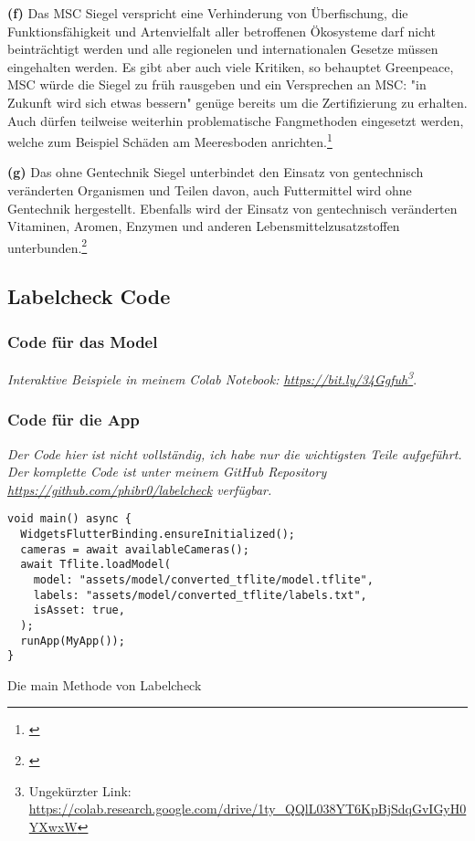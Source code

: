 \noindent\textbf{(f)} Das MSC Siegel verspricht eine Verhinderung von Überfischung, die Funktionsfähigkeit und Artenvielfalt aller betroffenen Ökosysteme darf nicht beinträchtigt werden und alle regionelen und internationalen Gesetze müssen eingehalten werden. Es gibt aber auch viele Kritiken, so behauptet Greenpeace, MSC würde die Siegel zu früh rausgeben und ein Versprechen an MSC: "in Zukunft wird sich etwas bessern" genüge bereits um die Zertifizierung zu erhalten. Auch dürfen teilweise weiterhin problematische Fangmethoden eingesetzt werden, welche zum Beispiel Schäden am Meeresboden anrichten.\footnote{\cite{msc}}

\noindent\textbf{(g)} Das ohne Gentechnik Siegel unterbindet den Einsatz von gentechnisch veränderten Organismen und Teilen davon, auch Futtermittel wird ohne Gentechnik hergestellt. Ebenfalls wird der Einsatz von gentechnisch veränderten Vitaminen, Aromen, Enzymen und anderen Lebensmittelzusatzstoffen unterbunden.\footnote{\cite{ohneGentechnik}}

\subsection{Labelcheck Code}\label{anhang:labelchecktf}

\subsubsection{Code für das Model}\label{tfcode}

\emph{Interaktive Beispiele in meinem Colab Notebook: \url{https://bit.ly/34Ggfuh}\footnote{Ungekürzter Link: \url{https://colab.research.google.com/drive/1ty_QQlL038YT6KpBjSdqGvIGyH0YXwxW}}}.

\subsubsection{Code für die App}

\emph{Der Code hier ist nicht vollständig, ich habe nur die wichtigsten Teile aufgeführt. Der komplette Code ist unter meinem GitHub Repository \url{https://github.com/phibr0/labelcheck} verfügbar.}

\begin{listing}[H]
    \begin{verbatim}
void main() async {
  WidgetsFlutterBinding.ensureInitialized();
  cameras = await availableCameras();
  await Tflite.loadModel(
    model: "assets/model/converted_tflite/model.tflite",
    labels: "assets/model/converted_tflite/labels.txt",
    isAsset: true,
  );
  runApp(MyApp());
}
    \end{verbatim}
    \caption{Die main Methode von Labelcheck}
\end{listing}


